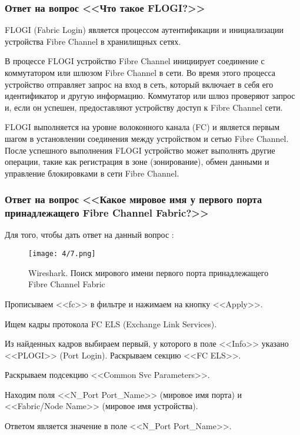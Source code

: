 \subsubsection{Ответ на вопрос <<Что такое FLOGI?>>}

FLOGI (Fabric Login) является процессом аутентификации и инициализации
устройства Fibre Channel в хранилищных сетях.

В процессе FLOGI устройство Fibre Channel инициирует соединение с коммутатором
или шлюзом Fibre Channel в сети. Во время этого процесса устройство отправляет
запрос на вход в сеть, который включает в себя его идентификатор и другую
информацию. Коммутатор или шлюз проверяют запрос и, если он успешен,
предоставляют устройству доступ к Fibre Channel сети.

FLOGI выполняется на уровне волоконного канала (FC) и является первым шагом в
установлении соединения между устройством и сетью Fibre Channel. После
успешного выполнения FLOGI устройство может выполнять другие операции, такие
как регистрация в зоне (зонирование), обмен данными и управление блокировками в
сети Fibre Channel.

\subsubsection{Ответ на вопрос <<Какое мировое имя у первого порта
    принадлежащего Fibre Channel Fabric?>>}

Для того, чтобы дать ответ на данный вопрос \doing:

\begin{figure}[ht]
    \centering\texttt{[image: 4/7.png]}
    \caption{Wireshark. Поиск мирового имени первого порта принадлежащего Fibre
        Channel Fabric}
\end{figure}

\begin{enumerate_num}
    \item Прописываем <<fc>> в фильтре и нажимаем на кнопку <<Apply>>.
    \item Ищем кадры протокола FC ELS (Exchange Link Services).
    \item Из найденных кадров выбираем первый, у которого в поле <<Info>>
    указано <<PLOGI>> (Port Login). Раскрываем секцию <<FC ELS>>.
    \item Раскрываем подсекцию <<Common Svc Parameters>>.
    \item Находим поля <<N\_Port Port\_Name>> (мировое имя порта) и
    <<Fabric/Node Name>> (мировое имя устройства).
    \item Ответом является значение в поле <<N\_Port Port\_Name>>.
\end{enumerate_num}

